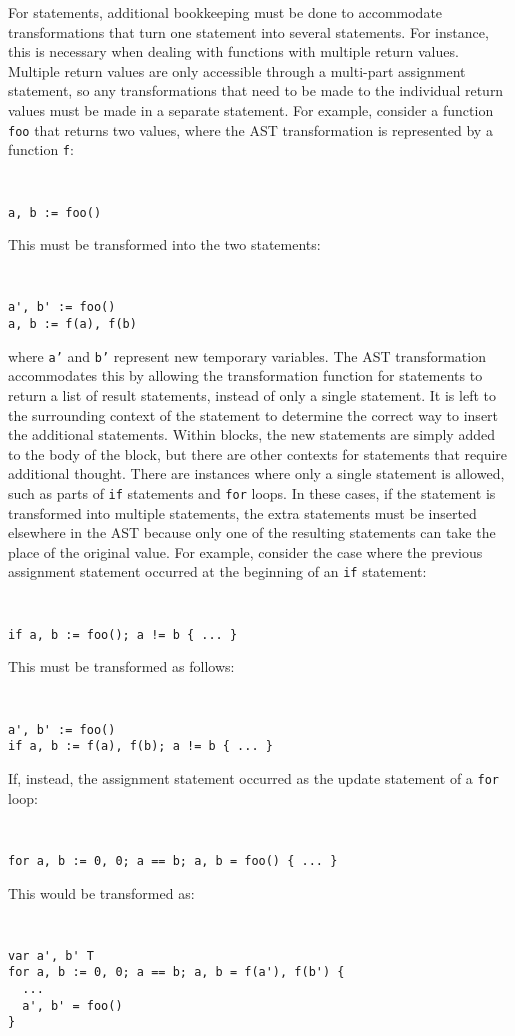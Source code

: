 \documentclass[letterpaper,11pt]{article}
\begin{document}
For statements, additional bookkeeping must be done to accommodate transformations that turn one statement into several statements. For instance, this is necessary when dealing with functions with multiple return values. Multiple return values are only accessible through a multi-part assignment statement, so any transformations that need to be made to the individual return values must be made in a separate statement. For example, consider a function \texttt{foo} that returns two values, where the AST transformation is represented by a function \texttt{f}:
{ \tt \small
\begin{verbatim}
a, b := foo()
\end{verbatim}
}
This must be transformed into the two statements:
{ \tt \small
\begin{verbatim}
a', b' := foo()
a, b := f(a), f(b)
\end{verbatim}
}
where \texttt{a'} and \texttt{b'} represent new temporary variables. The AST transformation accommodates this by allowing the transformation function for statements to return a list of result statements, instead of only a single statement. It is left to the surrounding context of the statement to determine the correct way to insert the additional statements. Within blocks, the new statements are simply added to the body of the block, but there are other contexts for statements that require additional thought. There are instances where only a single statement is allowed, such as parts of \texttt{if} statements and \texttt{for} loops. In these cases, if the statement is transformed into multiple statements, the extra statements must be inserted elsewhere in the AST because only one of the resulting statements can take the place of the original value. For example, consider the case where the previous assignment statement occurred at the beginning of an \texttt{if} statement:
{ \tt \small
\begin{verbatim}
if a, b := foo(); a != b { ... }
\end{verbatim} 
}

This must be transformed as follows:
{ \tt \small
\begin{verbatim}
a', b' := foo()
if a, b := f(a), f(b); a != b { ... }
\end{verbatim}
}

If, instead, the assignment statement occurred as the update statement of a \texttt{for} loop:
{ \tt \small
\begin{verbatim}
for a, b := 0, 0; a == b; a, b = foo() { ... }
\end{verbatim} 
}
This would be transformed as:
{ \tt \small
\begin{verbatim}
var a', b' T
for a, b := 0, 0; a == b; a, b = f(a'), f(b') {
  ...
  a', b' = foo()
}
\end{verbatim} 
}
\end{document}
